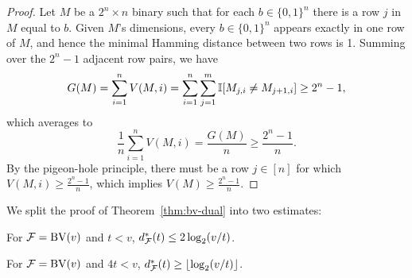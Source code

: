 \begin{proof}
  Let $M$ be a $2^n \times n$
  binary
  such that
for each
$b \in \{0,1\}^n$
there is a row $j$ in $M$
equal to $b$.  
%
Given $M$'s dimensions,
every
$b \in \{0,1\}^n$ appears exactly in one row of $M$,
and hence
the minimal Hamming distance between two rows is 1.
Summing over the $2^n-1$ adjacent row pairs, we have
\[G(M) = \sum_{i=1}^n V(M,i) = \sum_{i=1}^n\sum_{j=1}^m \mathbb{I}[M_{j,i} \neq M_{j+1,i}] \geq 2^n-1,\]
which averages to
\[\frac{1}{n} \sum_{i=1}^n V(M,i) = \frac{G(M)}{n} \geq \frac{2^n-1}{n} .\]
By
the pigeon-hole principle,
there must be
a row $j \in [n]$ for which
$V(M,i) \geq \frac{2^n-1}{n}$,
which implies
$V(M)  \geq \frac{2^n-1}{n}$.
\end{proof}

We split the proof of Theorem~\ref{thm:bv-dual} into two estimates:


\begin{lemma} \label{lem:bv-ub}
  For $\mathcal{F}=\mathrm{BV}(v)$ and $t<v$,
  $d^*_{\mathcal{F}}(t)\le2\log_2(v/t)$.
\end{lemma}

\begin{lemma} \label{lem:bv-lb}
  For $\mathcal{F}=\mathrm{BV}(v)$ and $4t<v$,
  $d^*_{\mathcal{F}}(t)\ge\left\lfloor\log_2(v/t)\right\rfloor$.
\end{lemma}

